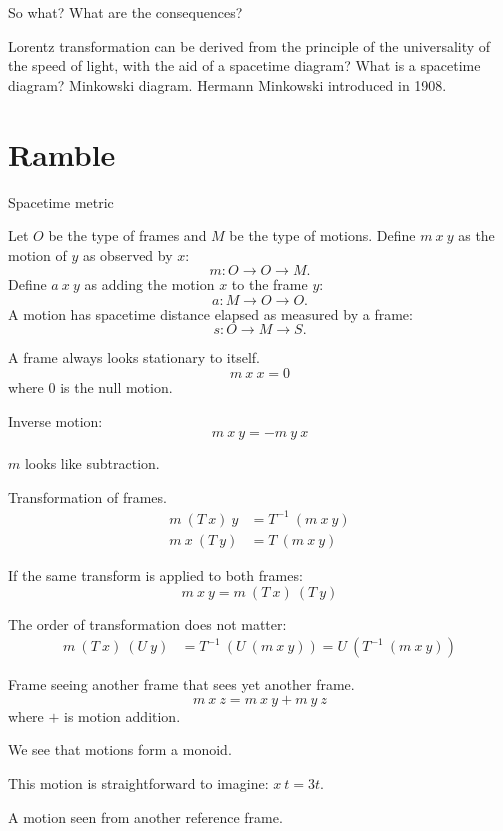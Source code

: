 So what?
What are the consequences?

Lorentz transformation can be derived from the principle of the universality of the speed of light,
with the aid of a spacetime diagram?
What is a spacetime diagram?
Minkowski diagram.
Hermann Minkowski introduced in 1908.

\section{Ramble}

Spacetime metric



Let $O$ be the type of frames and $M$ be the type of motions.
Define $m~x~y$ as the motion of $y$ as observed by $x$:
\[
m : O \to O \to M.
\]
Define $a~x~y$ as adding the motion $x$ to the frame $y$:
\[
a : M \to O \to O.
\]
A motion has spacetime distance elapsed as measured by a frame:
\[
s : O \to M \to S.
\]

A frame always looks stationary to itself.
\[
m~x~x = 0
\]
where $0$ is the null motion.

Inverse motion:
\[
m~x~y = -m~y~x
\]

$m$ looks like subtraction.

Transformation of frames.
\begin{align*}
m~(T~x)~y &= T^{-1}~(m~x~y)
\\ m~x~(T~y) &= T~(m~x~y)
\end{align*}

If the same transform is applied to both frames:
\[
m~x~y = m~(T~x)~(T~y)
\]

The order of transformation does not matter:
\begin{align*}
m~(T~x)~(U~y) &= T^{-1}~(U~(m~x~y)) = U~(T^{-1}~(m~x~y))
\end{align*}

Frame seeing another frame that sees yet another frame.
\[
m~x~z = m~x~y + m~y~z
\]
where $+$ is motion addition.

We see that motions form a monoid.

This motion is straightforward to imagine: $x~t = 3 t$.

A motion seen from another reference frame.

